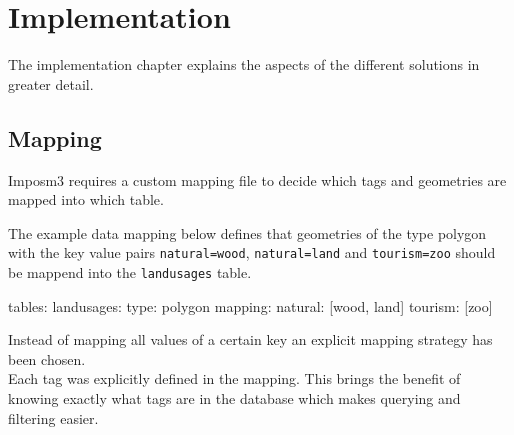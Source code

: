 \chapter{Implementation}\label{implementation}

The implementation chapter explains the aspects of the different solutions in greater detail.

\section{Mapping}

Imposm3 requires a custom mapping file to decide which tags and geometries are mapped into which table.

The example data mapping\cite{81_imposm.org_2015} below defines that geometries of the type polygon with the key value pairs \texttt{natural=wood}, \texttt{natural=land} and \texttt{tourism=zoo} should be mappend into the \texttt{landusages} table.

\begin{yamlcode}
tables:
   landusages:
     type: polygon
     mapping:
       natural: [wood, land]
       tourism: [zoo]
\end{yamlcode}

Instead of mapping all values of a certain key an explicit mapping strategy has been chosen.\\
Each tag was explicitly defined in the mapping. This brings the benefit of knowing exactly what tags are in the database which makes querying and filtering easier.

